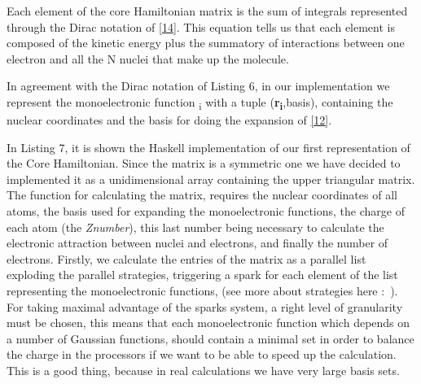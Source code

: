 \documentclass{tmr}
\begin{document}
Each element of the core Hamiltonian matrix is the sum of integrals represented through
the Dirac notation of \eqref{14}. This equation tells us that each element is composed
of the kinetic energy plus the summatory of interactions between one electron and all the N
nuclei that make up the molecule.

In agreement with the Dirac notation of Listing 6, in our implementation we represent the
monoelectronic function \textchi \textsubscript{i} with a tuple 
(\textbf{r\textsubscript{i}},basis), containing the nuclear coordinates 
and the basis for doing the expansion of \eqref{12}.

In Listing 7, it is shown the Haskell implementation of our first representation of 
the Core Hamiltonian. Since the matrix is a symmetric one we have decided to implemented it
as a unidimensional array containing the upper triangular matrix.
The function for calculating the matrix, requires the nuclear coordinates of all atoms, the basis used
for expanding the monoelectronic functions, the charge of each atom (the \textit{Znumber}),
this last number being necessary to calculate the electronic attraction 
between nuclei and electrons, and finally the number of electrons. Firstly, we
calculate the entries of the matrix as a parallel list exploding the parallel strategies,
triggering a spark for each element of the list representing the monoelectronic functions, 
(see more about strategies here :~\cite{strategies}). For taking maximal advantage
of the sparks system, a right level of granularity must be chosen, this means that 
each monoelectronic function which depends on a number of Gaussian functions, should contain
a minimal set in order to balance the charge in the processors if we want to be able to
speed up the calculation. This is a good thing, because in real calculations we
have very large basis sets.
\end{document}
